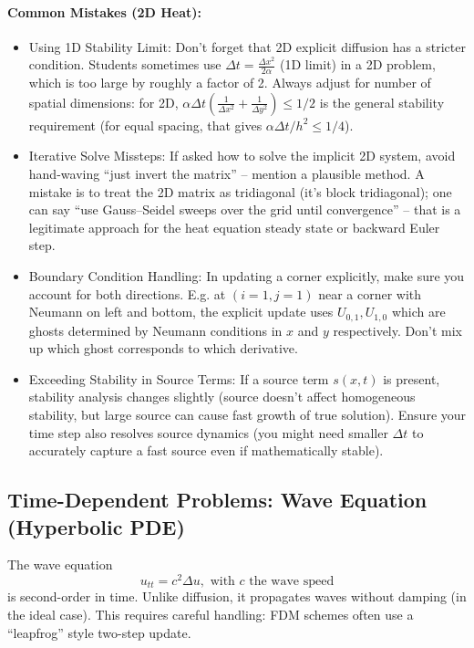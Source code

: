 \documentclass[a4paper,11pt]{article}
\begin{document}
\paragraph{Common Mistakes (2D Heat):}
\begin{itemize}
    \item Using 1D Stability Limit: Don’t forget that 2D explicit diffusion has a stricter condition. Students sometimes use $\Delta t = \frac{\Delta x^2}{2\alpha}$ (1D limit) in a 2D problem, which is too large by roughly a factor of 2. Always adjust for number of spatial dimensions: for 2D, $\alpha\Delta t(\frac{1}{\Delta x^2}+\frac{1}{\Delta y^2}) \le 1/2$ is the general stability requirement (for equal spacing, that gives $\alpha \Delta t/h^2 \le 1/4$).
    \item Iterative Solve Missteps: If asked how to solve the implicit 2D system, avoid hand-waving “just invert the matrix” -- mention a plausible method. A mistake is to treat the 2D matrix as tridiagonal (it’s block tridiagonal); one can say “use Gauss--Seidel sweeps over the grid until convergence” -- that is a legitimate approach for the heat equation steady state or backward Euler step.
    \item Boundary Condition Handling: In updating a corner explicitly, make sure you account for both directions. E.g. at $(i=1,j=1)$ near a corner with Neumann on left and bottom, the explicit update uses $U_{0,1}, U_{1,0}$ which are ghosts determined by Neumann conditions in $x$ and $y$ respectively. Don’t mix up which ghost corresponds to which derivative.
    \item Exceeding Stability in Source Terms: If a source term $s(x,t)$ is present, stability analysis changes slightly (source doesn’t affect homogeneous stability, but large source can cause fast growth of true solution). Ensure your time step also resolves source dynamics (you might need smaller $\Delta t$ to accurately capture a fast source even if mathematically stable).
\end{itemize}
\subsection{Time-Dependent Problems: Wave Equation (Hyperbolic PDE)}
The wave equation
$$
    u_{tt} = c^2 \Delta u, \text{ with } c \text{ the wave speed}
$$
is second-order in time. Unlike diffusion, it propagates waves without damping (in the ideal case).
This requires careful handling: FDM schemes often use a “leapfrog” style two-step update.
\end{document}
